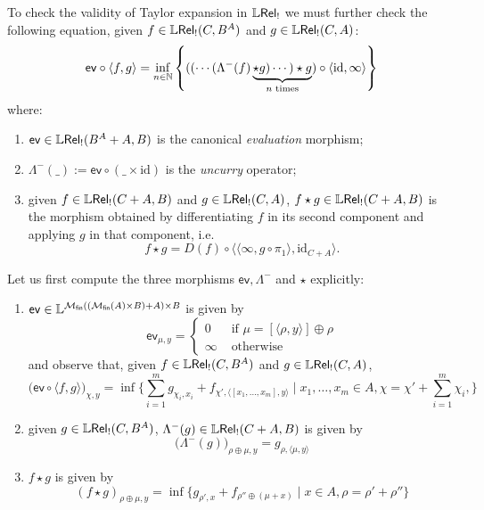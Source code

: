 To check the validity of Taylor expansion in $\mathbb{L} \mathsf{Rel}_!$ we must further check the following equation, given $f\in \mathbb{L} \mathsf{Rel}_!(C, B^{A})$ and $g\in \mathbb{L} \mathsf{Rel}_!(C,A)$:
$$
\mathsf{ev}\circ \langle f,g\rangle= \inf_{n\in \mathbb{N}}
\left\{(( \cdots (\Lambda^{-}(f) \underbrace{\star g)\cdots )\star g}_{n\text{ times}})\circ \langle \mathrm{id}, \infty\rangle\right\}
$$
where:
\begin{enumerate}
\item $\mathsf{ev}\in \mathbb{L} \mathsf{Rel}_!(B^{A}+A, B)$ is the canonical \emph{evaluation} morphism;

\item $\Lambda^{-}(\_):= \mathsf{ev}\circ (\_\times \mathrm{id})$ is the \emph{uncurry} operator;

\item given $f\in \mathbb{L} \mathsf{Rel}_!(C+A,B)$ and $g\in \mathbb{L} \mathsf{Rel}_!(C,A)$, 
$f\star g\in \mathbb{L} \mathsf{Rel}_!(C+A,B)$ is the morphism obtained by differentiating $f$ in its second component and applying $g$ in that component, i.e.~
$$
f\star g =  D(f)\circ \langle \langle \infty, g\circ \pi_{1}\rangle, \mathrm{id}_{C+A}\rangle.
$$ 

\end{enumerate}



Let us first compute the three morphisms $\mathsf{ev}, \Lambda^{-}$ and $\star$ explicitly:
\begin{enumerate}

\item $\mathsf{ev}\in \mathbb{L}^{ \mathcal{M}_{\mathsf{fin}}(  ( \mathcal{M}_{\mathsf{fin}}(A)\times B)       +  A    ) \times B  }$ is given by
$$\mathsf{ev}_{\mu,y}=
 \begin{cases}
 0 & \text{ if } \mu=[ \langle\rho, y\rangle]  \oplus \rho \\
 \infty & \text{ otherwise}
 \end{cases}
 $$
and observe that, given $f\in \mathbb{L} \mathsf{Rel}_!(C, B^{A})$ and $g\in \mathbb{L} \mathsf{Rel}_!(C,A)$, 
$$
\big(\mathsf{ev}\circ \langle f,g\rangle \big)_{\chi, y}= 
\inf\Big \{ 
\sum_{i=1}^{m}g_{\chi_{i},x_{i}}+
f_{\chi', \langle [x_{1},\dots, x_{m}],y\rangle}
\mid 
x_{1},\dots, x_{m}\in A,
\chi= \chi'+\sum_{i=1}^{m}\chi_{i}, 
\Big \}
$$



\item given $g\in \mathbb{L} \mathsf{Rel}_!(C, B^{A})$, 
$\Lambda^{-}(g)\in \mathbb{L} \mathsf{Rel}_!(C+A, B)$ is given by 
$$
\big(\Lambda^{-}(g)\big)_{\rho\oplus\mu,y}=g_{\rho, \langle \mu,y\rangle}
$$


\item $f\star g$ is given by 
$$
(f\star g)_{\rho\oplus\mu,y}=
\inf\Big\{
g_{\rho',x}+
f_{\rho''\oplus(\mu+x)}
\mid
x\in A,
\rho= \rho'+\rho''
\Big\}
$$

\end{enumerate}


